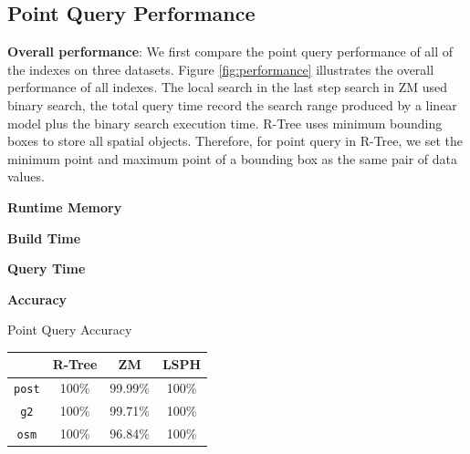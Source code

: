\subsection{Point Query Performance}


\textbf{Overall performance}: We first compare the point query performance of all of the indexes on three datasets. Figure \ref{fig:performance} illustrates the overall performance of all indexes. The local search in the last step search in ZM used binary search, the total query time record the search range produced by a linear model plus the binary search execution time.  R-Tree uses minimum bounding boxes to store all spatial objects. Therefore, for point query in R-Tree, we set the minimum point and maximum point of a bounding box as the same pair of data values. 


\textbf{Runtime Memory}

\textbf{Build Time}

\textbf{Query Time}

\textbf{Accuracy}

\begin{center}
\begin{adjustbox}{max width={\textwidth}, max totalheight={\textheight},keepaspectratio}
\begin{threeparttable}
\caption{Point Query Accuracy}
\begin{tabular}{c|c c c}
    \toprule
        &\textbf{R-Tree}  & \textbf{ZM} & \textbf{LSPH}             \\ \midrule 
    \texttt{post}    & 100\% & 99.99\% & 100\% \\
    \texttt{g2}      & 100\% & 99.71\% & 100\%  \\
    \texttt{osm}     & 100\% & 96.84\% & 100\% \\
     \bottomrule
\end{tabular}
\end{threeparttable}
\label{table:accuracy}
\end{adjustbox}
\end{center}



